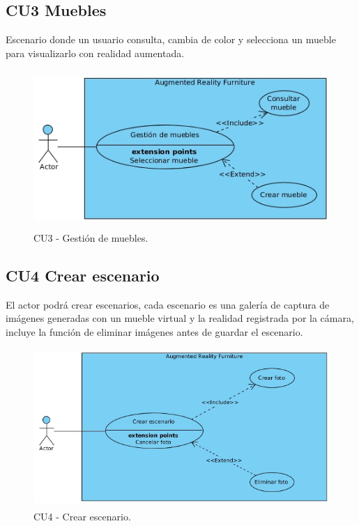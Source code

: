 \subsection{CU3 Muebles}  \par
Escenario donde un usuario consulta, cambia de color y selecciona un mueble para visualizarlo con realidad aumentada.
\begin{figure}[h!]
	\centering
	\includegraphics[width=12cm,height=6cm]{imagenes/analisis/seleccionarMueble.jpg}
	\caption{CU3 - Gestión de muebles.}
	\label{fig:analogo}
\end{figure}

\subsection{CU4 Crear escenario}\par
El actor podrá crear escenarios, cada escenario es una galería de captura de imágenes generadas con un mueble virtual y la realidad registrada por la cámara, incluye la función de eliminar imágenes antes de guardar el escenario.
\begin{figure}[h!]
	\centering
	\includegraphics[width=12cm,height=6cm]{imagenes/analisis/crearEscenario.jpg}
	\caption{CU4 - Crear escenario.}
	\label{fig:analogo}
\end{figure}

\newpage
